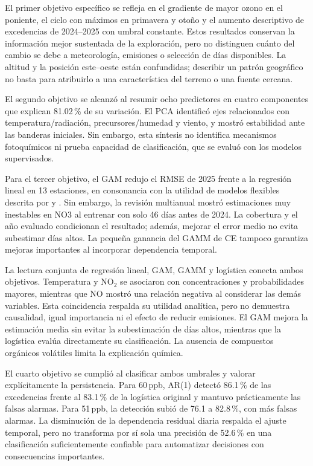 \documentclass[11pt,letterpaper]{article}
\newcommand{\ppb}{\,ppb}
\newenvironment{cambio}{}{}
\begin{document}
El primer objetivo específico se refleja en el gradiente de mayor ozono en el poniente, el ciclo con máximos en primavera y otoño y el aumento descriptivo de excedencias de 2024--2025 con umbral constante. Estos resultados conservan la información mejor sustentada de la exploración, pero no distinguen cuánto del cambio se debe a meteorología, emisiones o selección de días disponibles. La altitud y la posición este--oeste están confundidas; describir un patrón geográfico no basta para atribuirlo a una característica del terreno o una fuente cercana.

El segundo objetivo se alcanzó al resumir ocho predictores en cuatro componentes que explican 81.02\,\% de su variación. El PCA identificó ejes relacionados con temperatura/radiación, precursores/humedad y viento, y mostró estabilidad ante las banderas iniciales. Sin embargo, esta síntesis no identifica mecanismos fotoquímicos ni prueba capacidad de clasificación, que se evaluó con los modelos supervisados.


\begin{cambio}
Para el tercer objetivo, el GAM redujo el RMSE de 2025 frente a la regresión lineal en 13 estaciones, en consonancia con la utilidad de modelos flexibles descrita por \citet{laban2020} y \citet{gao2022}. Sin embargo, la revisión multianual mostró estimaciones muy inestables en NO3 al entrenar con solo 46 días antes de 2024. La cobertura y el año evaluado condicionan el resultado; además, mejorar el error medio no evita subestimar días altos. La pequeña ganancia del GAMM de CE tampoco garantiza mejoras importantes al incorporar dependencia temporal.
\end{cambio}



\begin{cambio}
La lectura conjunta de regresión lineal, GAM, GAMM y logística conecta ambos objetivos. Temperatura y NO$_2$ se asociaron con concentraciones y probabilidades mayores, mientras que NO mostró una relación negativa al considerar las demás variables. Esta coincidencia respalda su utilidad analítica, pero no demuestra causalidad, igual importancia ni el efecto de reducir emisiones. El GAM mejora la estimación media sin evitar la subestimación de días altos, mientras que la logística evalúa directamente su clasificación. La ausencia de compuestos orgánicos volátiles limita la explicación química.
\end{cambio}


El cuarto objetivo se cumplió al clasificar ambos umbrales y valorar explícitamente la persistencia. Para 60\ppb, AR(1) detectó 86.1\,\% de las excedencias frente al 83.1\,\% de la logística original y mantuvo prácticamente las falsas alarmas. Para 51\ppb, la detección subió de 76.1 a 82.8\,\%, con más falsas alarmas. La disminución de la dependencia residual diaria respalda el ajuste temporal, pero no transforma por sí sola una precisión de 52.6\,\% en una clasificación suficientemente confiable para automatizar decisiones con consecuencias importantes.
\end{document}
